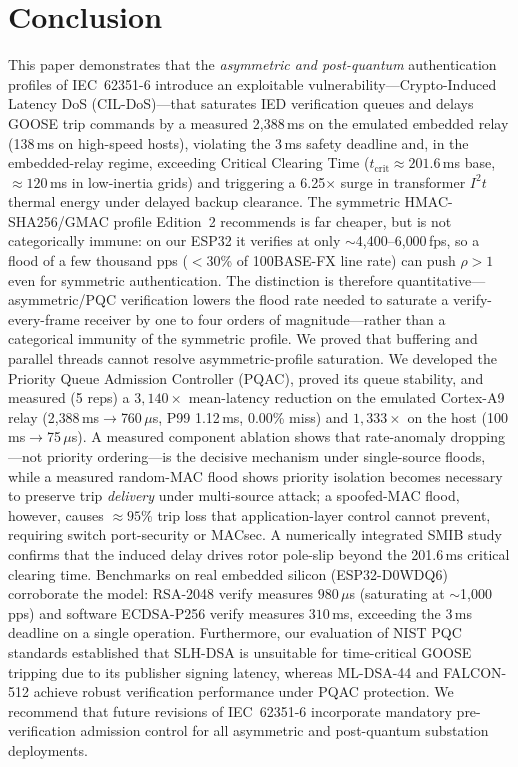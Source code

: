 \documentclass[journal]{IEEEtran}
\begin{document}
\section{Conclusion}
\label{sec:conclusion}
This paper demonstrates that the \emph{asymmetric and post-quantum} authentication profiles of IEC~62351-6 introduce an exploitable vulnerability---Crypto-Induced Latency DoS (CIL-DoS)---that saturates IED verification queues and delays GOOSE trip commands by a measured 2,388\,ms on the emulated embedded relay (138\,ms on high-speed hosts), violating the 3\,ms safety deadline and, in the embedded-relay regime, exceeding Critical Clearing Time ($t_{\text{crit}} \approx 201.6$\,ms base, $\approx 120$\,ms in low-inertia grids) and triggering a 6.25$\times$ surge in transformer $I^2 t$ thermal energy under delayed backup clearance. The symmetric HMAC-SHA256/GMAC profile Edition~2 recommends is far cheaper, but is not categorically immune: on our ESP32 it verifies at only $\sim$4{,}400--6{,}000\,fps, so a flood of a few thousand pps ($<$30\% of 100BASE-FX line rate) can push $\rho>1$ even for symmetric authentication. The distinction is therefore quantitative---asymmetric/PQC verification lowers the flood rate needed to saturate a verify-every-frame receiver by one to four orders of magnitude---rather than a categorical immunity of the symmetric profile. We proved that buffering and parallel threads cannot resolve asymmetric-profile saturation. We developed the Priority Queue Admission Controller (PQAC), proved its queue stability, and measured (5 reps) a $3{,}140\times$ mean-latency reduction on the emulated Cortex-A9 relay (2{,}388\,ms$\to$760\,$\mu$s, P99 1.12\,ms, 0.00\% miss) and $1{,}333\times$ on the host (100\,ms$\to$75\,$\mu$s). A measured component ablation shows that rate-anomaly dropping---not priority ordering---is the decisive mechanism under single-source floods, while a measured random-MAC flood shows priority isolation becomes necessary to preserve trip \emph{delivery} under multi-source attack; a spoofed-MAC flood, however, causes $\approx 95\%$ trip loss that application-layer control cannot prevent, requiring switch port-security or MACsec. A numerically integrated SMIB study confirms that the induced delay drives rotor pole-slip beyond the 201.6\,ms critical clearing time. Benchmarks on real embedded silicon (ESP32-D0WDQ6) corroborate the model: RSA-2048 verify measures $980\,\mu$s (saturating at $\sim$1{,}000\,pps) and software ECDSA-P256 verify measures $310$\,ms, exceeding the 3\,ms deadline on a single operation. Furthermore, our evaluation of NIST PQC standards established that SLH-DSA is unsuitable for time-critical GOOSE tripping due to its publisher signing latency, whereas ML-DSA-44 and FALCON-512 achieve robust verification performance under PQAC protection. We recommend that future revisions of IEC~62351-6 incorporate mandatory pre-verification admission control for all asymmetric and post-quantum substation deployments.
\end{document}
